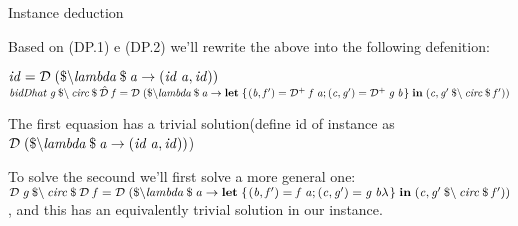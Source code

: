\documentclass{beamer}
\newcommand{\Varid}[1]{\mathit{#1}}
\begin{document}
\begin{frame}{Instance deduction}

Based on  (DP.1) e (DP.2) we'll rewrite the above into the following defenition:

    \ensuremath{\Varid{id}\mathrel{=}\mathcal{D}\;(\mathbin{\$\char92 }\Varid{lambda}\mathbin{\$}\Varid{a}\rightarrow (\Varid{id}\;\Varid{a},\Varid{id}))}
    \ensuremath{\Varid{bidDhat}\;\Varid{g}\mathbin{\$\char92 }\Varid{circ}\mathbin{\$}\mathcal{\hat{D}}\;\Varid{f}\mathrel{=}\mathcal{D}\;(\mathbin{\$\char92 }\Varid{lambda}\mathbin{\$}\Varid{a}\rightarrow \mathbf{let}\;\{\mskip1.5mu (\Varid{b},\Varid{f'})\mathrel{=}\mathcal{D}^{+}\;\Varid{f}\;\Varid{a};(\Varid{c},\Varid{g'})\mathrel{=}\mathcal{D}^{+}\;\Varid{g}\;\Varid{b}\mskip1.5mu\}\;\mathbf{in}\;(\Varid{c},\Varid{g'}\mathbin{\$\char92 }\Varid{circ}\mathbin{\$}\Varid{f'}))}


The first equasion has a trivial solution(define id of instance as \ensuremath{\mathcal{D}\;(\mathbin{\$\char92 }\Varid{lambda}\mathbin{\$}\Varid{a}\rightarrow (\Varid{id}\;\Varid{a},\Varid{id}))})

To solve the secound we'll first solve a more general one:
\ensuremath{\mathcal{D}\;\Varid{g}\mathbin{\$\char92 }\Varid{circ}\mathbin{\$}\mathcal{D}\;\Varid{f}\mathrel{=}\mathcal{D}\;(\mathbin{\$\char92 }\Varid{lambda}\mathbin{\$}\Varid{a}\rightarrow \mathbf{let}\;\{\mskip1.5mu (\Varid{b},\Varid{f'})\mathrel{=}\Varid{f}\;\Varid{a};(\Varid{c},\Varid{g'})\mathrel{=}\Varid{g}\;\Varid{b}\lambda \mskip1.5mu\}\;\mathbf{in}\;(\Varid{c},\Varid{g'}\mathbin{\$\char92 }\Varid{circ}\mathbin{\$}\Varid{f'}))}
, and this has an equivalently trivial solution in our instance.

\end{frame}
\end{document}
